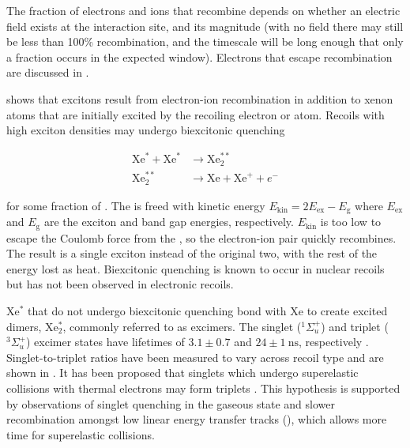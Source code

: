 The fraction of electrons and ions that recombine depends on whether an electric field exists at the interaction
site, and its magnitude (with no field there may still be less than 100\% recombination, and the timescale will be long enough that
only a fraction occurs in the expected window).  Electrons that escape recombination are discussed in .

 shows that excitons result from electron-ion recombination in addition to xenon atoms that are initially
excited by the recoiling electron or atom.  Recoils with high exciton densities may undergo biexcitonic quenching

\vspace{-25pt}

\begin{subequations}
\begin{align}
\mathrm{Xe}^* + \mathrm{Xe}^* &\rightarrow \mathrm{Xe}_2^{**} \\
\mathrm{Xe}_2^{**} &\rightarrow \mathrm{Xe} + \mathrm{Xe}^+ + e^-
\end{align}
\label{eq:biexcitonic_quenching}
\end{subequations}

\vspace{-25pt}

\noindent for some fraction of .  The \electron is freed with kinetic energy
$E_{\mathrm{kin}} = 2E_{\mathrm{ex}} - E_{\mathrm{g}}$ where $E_{\mathrm{ex}}$ and
$E_{\mathrm{g}}$ are the exciton and band gap energies, respectively.  $E_{\mathrm{kin}}$ is too low to escape the Coulomb force from the
, so the electron-ion pair quickly recombines.  The result is a single exciton instead of the original two, with the rest of the
energy lost as heat.  Biexcitonic quenching is known to occur in nuclear recoils but has not been observed in electronic recoils.

Xe$^{*}$ that do not undergo biexcitonic quenching bond with Xe to create excited dimers, Xe$_{2}^{*}$, commonly referred to as
excimers.  The singlet ($^1 \Sigma_u^+$) and triplet ($^3 \Sigma_u^+$) excimer states have lifetimes of $3.1 \pm 0.7$ and
$24 \pm 1\ \mathrm{ns}$,
respectively .  Singlet-to-triplet ratios have been measured to vary across recoil type and are shown in
.  It has been proposed that singlets which undergo superelastic collisions with thermal electrons may form
triplets .  This hypothesis is supported by observations of singlet quenching in the gaseous state 
and slower
recombination amongst low linear energy transfer tracks (), which allows more time for superelastic
collisions.

